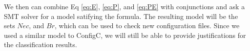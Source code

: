 We then can combine Eq \ref{eq:E}, \ref{eq:P}, and \ref{eq:PE} with conjunctions and ask a SMT solver for a model satifying the formula.
The resulting model will be the sets $Nec$, and $Br$, which can be used to check new configuration files.
Since we used a similar model to ConfigC, we will still be able to provide justifications for the classification results.

